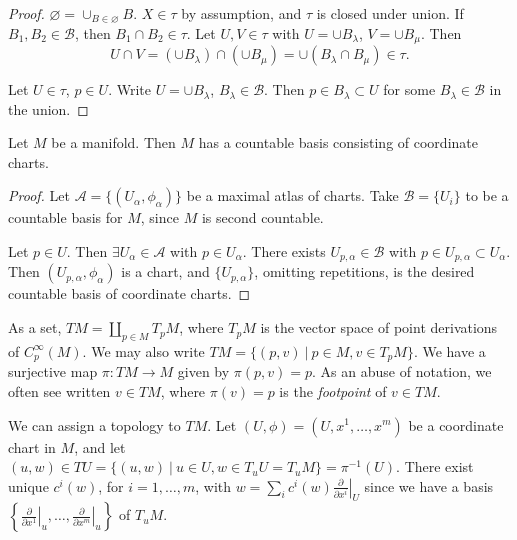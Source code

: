 \begin{proof}
$\varnothing = \cup_{B \in \varnothing} B$. $X \in \tau$ by
assumption, and $\tau$ is closed under union. If $B_1, B_2 \in \mathscr{B}$,
then $B_1 \cap B_2 \in \tau$.
Let $U, V \in \tau$ with $U = \cup B_\lambda$,
$V = \cup B_\mu$. Then
$$
  U \cap V
= (\cup B_\lambda) \cap (\cup B_\mu)
= \cup (B_\lambda \cap B_\mu)
\in \tau.
$$

Let $U \in \tau$, $p \in U$. Write
$U = \cup B_\lambda$, $B_\lambda \in \mathscr{B}$. Then
$p \in B_\lambda \subset U$ for some $B_\lambda \in \mathscr{B}$ in
the union.
\end{proof}

\begin{prop}
Let $M$ be a manifold. Then $M$ has a countable basis consisting of
coordinate charts.
\end{prop}

\begin{proof}
Let $\mathcal{A} = \{ (U_\alpha, \phi_\alpha) \}$ be a maximal atlas
of charts. Take $\mathscr{B} = \{ U_i \}$ to be a countable basis for
$M$, since $M$ is second countable.

Let $p \in U$. Then $\exists U_\alpha \in \mathcal{A}$ with
$p \in U_\alpha$. There exists $U_{p, \alpha} \in \mathscr{B}$ with
$p \in U_{p, \alpha} \subset U_\alpha$. Then
$(U_{p, \alpha}, \phi_\alpha)$ is a chart, and
$\{ U_{p, \alpha} \}$, omitting repetitions, is the desired countable
basis of coordinate charts.
\end{proof}

\begin{defn}
As a set, $TM = \coprod_{p \in M} T_p M$, where $T_p M$ is the vector
space of point derivations of $C_p^\infty(M)$. We may also write
$TM = \{(p, v) ~\vert~ p \in M, v \in T_p M \}$. We have a surjective
map $\pi: TM \to M$ given by $\pi(p, v) = p$. As an abuse of notation,
we often see written $v \in TM$, where $\pi(v) = p$ is the
\emph{footpoint} of $v \in TM$.
\end{defn}

We can assign a topology to $TM$. Let
$(U, \phi) = (U, x^1, \dots, x^m)$ be a coordinate chart in $M$, and
let
$(u, w) \in T U = \{ (u, w) ~\vert~ u \in U, w \in T_u U = T_u M \}
 = \pi^{-1}(U)$.
There exist unique $c^i(w)$, for $i = 1, \dots, m$, with
$w = \sum_i c^i(w) \left.\frac{\partial}{\partial x^i}\right|_U$
since we have a basis
$\left\{
  \left.\frac{\partial}{\partial x^1}\right|_u, \dots,
  \left.\frac{\partial}{\partial x^m}\right|_u
\right\}$ of $T_uM$.


